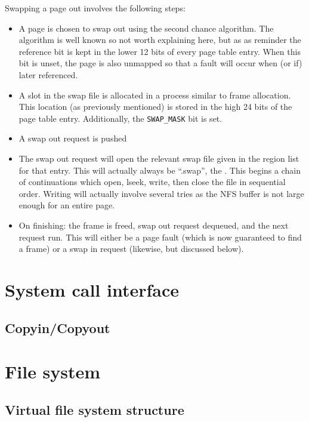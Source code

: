 \documentclass[12pt,english]{article}
\begin{document}
Swapping a page out involves the following steps:
\begin{itemize}
\item A page is chosen to swap out using the second chance algorithm.  The algorithm is well known so not worth explaining here, but as as reminder the reference bit is kept in the lower 12 bits of every page table entry.  When this bit is unset, the page is also unmapped so that a fault will occur when (or if) later referenced.
\item A slot in the swap file is allocated in a process similar to frame allocation.  This location (as previously mentioned) is stored in the high 24 bits of the page table entry.  Additionally, the \texttt{SWAP\_MASK} bit is set.
\item A swap out request is pushed 
\item The swap out request will open the relevant swap file given in the region list for that entry.  This will actually always be ``.swap'', the .  This begins a chain of continuations which open, lseek, write, then close the file in sequential order.  Writing will actually involve several tries as the NFS buffer is not large enough for an entire page.
\item On finishing: the frame is freed, swap out request dequeued, and the next request run.  This will either be a page fault (which is now guaranteed to find a frame) or a swap in request (likewise, but discussed below).
\end{itemize}



\section{System call interface}

\subsection{Copyin/Copyout}


\section{File system}


\subsection{Virtual file system structure}
\end{document}
